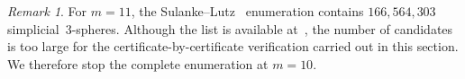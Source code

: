 \documentclass{amsart}
\numberwithin{equation}{section}
\theoremstyle{definition}
\theoremstyle{remark}
\newtheorem{remark}[theorem]{Remark}
\begin{document}
\begin{remark}
    For $m=11$, the Sulanke--Lutz~\cite{Sulanke-Lutz2009} enumeration contains $166,564,303$ simplicial~$3$-spheres.
    Although the list is available at~\cite{LutzManifoldPage3Manifolds}, the number of candidates is too large for the certificate-by-certificate verification carried out in this section.
    We therefore stop the complete enumeration at $m=10$.
\end{remark}


%
%
\providecommand{\bysame}{\leavevmode\hbox to3em{\hrulefill}\thinspace}
\providecommand{\MR}{\relax\ifhmode\unskip\space\fi MR }
\providecommand{\MRhref}[2]{%
  \href{http://www.ams.org/mathscinet-getitem?mr=#1}{#2}
}
\providecommand{\href}[2]{#2}
\end{document}
